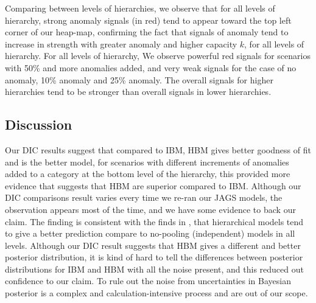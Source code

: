 \newpara

Comparing between levels of hierarchies, we observe that for all levels of hierarchy, strong anomaly signals (in red) tend to appear toward the top left corner of our heap-map, confirming the fact that signals of anomaly tend to increase in strength with greater anomaly and higher capacity $k$, for all levels of hierarchy. For all levels of hierarchy, We observe powerful red signals for scenarios with 50\% and more anomalies added, and very weak signals for the case of no anomaly, 10\% anomaly and 25\% anomaly. The overall signals for higher hierarchies tend to be stronger than overall signals in lower hierarchies. 


\subsection{Discussion}

Our DIC results suggest that compared to IBM, HBM gives better goodness of fit and is the better model, for scenarios with different increments of anomalies added to a category at the bottom level of the hierarchy, this provided more evidence that suggests that HBM are superior compared to IBM. Although our DIC comparisons result varies every time we re-ran our JAGS models, the observation appears most of the time, and we have some evidence to back our claim. The finding is consistent with the finds in  \citet{gelman2006multilevel}, that hierarchical models tend to give a better prediction compare to no-pooling (independent) models in all levels. Although our DIC result suggests that HBM gives a different and better posterior distribution, it is kind of hard to tell the differences between posterior distributions for IBM and HBM with all the noise present, and this reduced out confidence to our claim. To rule out the noise from uncertainties in Bayesian posterior is a complex and calculation-intensive process and are out of our scope.

\newpara


